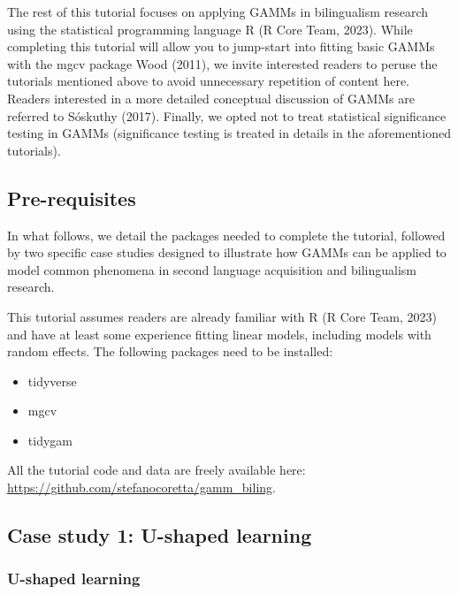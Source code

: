 \documentclass[
  letterpaper,
  DIV=11,
  numbers=noendperiod]{scrartcl}
\begin{document}
The rest of this tutorial focuses on applying GAMMs in bilingualism
research using the statistical programming language R (R Core Team,
2023). While completing this tutorial will allow you to jump-start into
fitting basic GAMMs with the mgcv package Wood (2011), we invite
interested readers to peruse the tutorials mentioned above to avoid
unnecessary repetition of content here. Readers interested in a more
detailed conceptual discussion of GAMMs are referred to Sóskuthy (2017).
Finally, we opted not to treat statistical significance testing in GAMMs
(significance testing is treated in details in the aforementioned
tutorials).

\subsection{Pre-requisites}\label{pre-requisites}

In what follows, we detail the packages needed to complete the tutorial,
followed by two specific case studies designed to illustrate how GAMMs
can be applied to model common phenomena in second language acquisition
and bilingualism research.

This tutorial assumes readers are already familiar with R (R Core Team,
2023) and have at least some experience fitting linear models, including
models with random effects. The following packages need to be installed:

\begin{itemize}
\item
  tidyverse
\item
  mgcv
\item
  tidygam
\end{itemize}

All the tutorial code and data are freely available here:
\url{https://github.com/stefanocoretta/gamm_biling}.

\subsection{Case study 1: U-shaped
learning}\label{case-study-1-u-shaped-learning}

\subsubsection{U-shaped learning}\label{u-shaped-learning}
\end{document}
